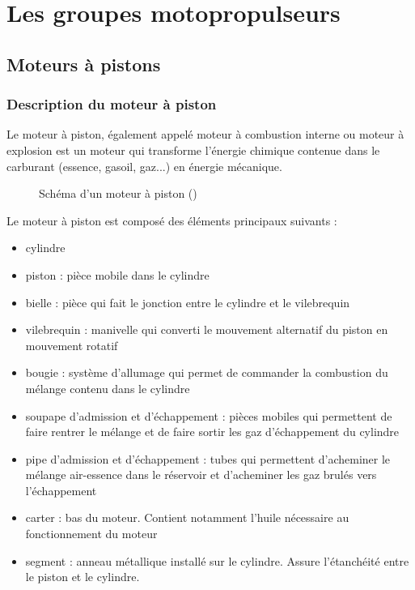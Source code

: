 

\section{Les groupes motopropulseurs}

	\subsection{Moteurs à pistons}
		\subsubsection{Description du moteur à piston}
		Le moteur à piston, également appelé moteur à combustion interne ou moteur à explosion est un moteur qui transforme l'énergie chimique contenue dans le carburant (essence, gasoil, gaz...) en énergie mécanique.
		\begin{figure}[H]
  		\centering
  		\caption{Schéma d'un moteur à piston (\cite{tikz::schemaMoteurPiston})}
		\end{figure}
		
		Le moteur à piston est composé des éléments principaux suivants :
		\begin{itemize}
			\item cylindre
			\item piston : pièce mobile dans le cylindre
			\item bielle : pièce qui fait le jonction entre le cylindre et le vilebrequin
			\item vilebrequin : manivelle qui converti le mouvement alternatif du piston en mouvement rotatif
			\item bougie : système d'allumage qui permet de commander la combustion du mélange contenu dans le cylindre
			\item soupape d'admission et d'échappement : pièces mobiles qui permettent de faire rentrer le mélange et de faire sortir les gaz d'échappement du cylindre 
			\item pipe d'admission et d'échappement : tubes qui permettent d'acheminer le mélange air-essence dans le réservoir et d'acheminer les gaz brulés vers l'échappement
			\item carter : bas du moteur. Contient notamment l'huile nécessaire au fonctionnement du moteur
			\item segment : anneau métallique installé sur le cylindre. Assure l'étanchéité entre le piston et le cylindre.
		\end{itemize}
	
